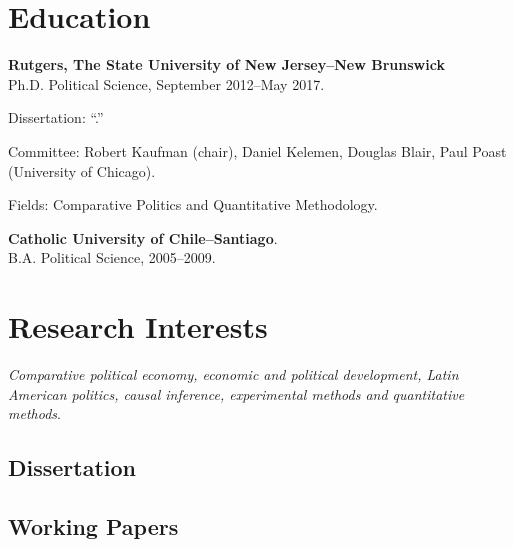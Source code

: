 \documentclass[letterpaper]{article}
\renewenvironment{itemize}{
  \begin{list}{}{
    \setlength{\leftmargin}{1.5em}
  }
}{
  \end{list}
}
\begin{document}
\section*{Education}

\begin{itemize}
  \item {\bf Rutgers, The State University of New Jersey--New Brunswick}\\
  Ph.D. Political Science, September 2012--May 2017.
    	\begin{itemize}
      		\item[] Dissertation: ``{\unskip}.''
      		\item[] Committee: Robert Kaufman (chair), Daniel Kelemen, Douglas Blair, Paul Poast (University of Chicago).
          \item[] Fields: Comparative Politics and Quantitative Methodology.
		  \end{itemize}

\item {\bf Catholic University of Chile--Santiago}.\\
B.A. Political Science, 2005--2009.
\end{itemize}


\section*{Research Interests}

\emph{Comparative political economy, economic and political development, Latin American politics, causal inference, experimental methods and quantitative methods}.

\subsection*{Dissertation}

{\unskip}



\subsection*{Working Papers}
\end{document}
